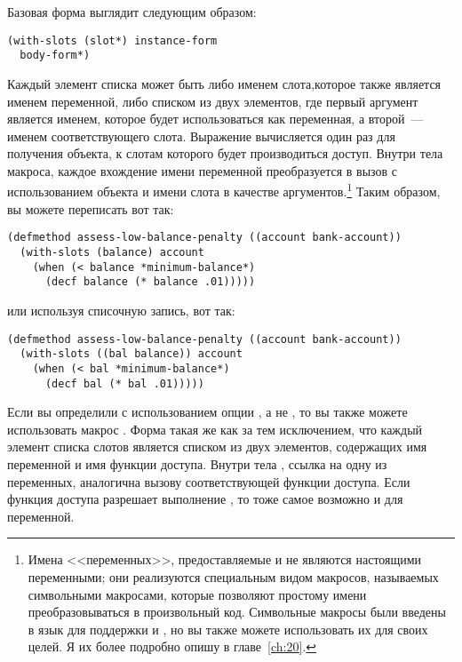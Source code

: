 Базовая форма   выглядит следующим образом:

\begin{lstlisting}
(with-slots (slot*) instance-form
  body-form*)
\end{lstlisting}

Каждый элемент списка  может быть либо именем слота,которое также является
именем переменной, либо списком из двух элементов, где первый аргумент является именем,
которое будет использоваться как переменная, а второй~--- именем соответствующего слота.
Выражение  вычисляется один раз для получения объекта, к слотам
которого будет производиться доступ.  Внутри тела макроса, каждое вхождение имени
переменной преобразуется в вызов  с использованием объекта и имени слота
в качестве аргументов.\footnote{Имена <<переменных>>, предоставляемые  и
   не являются настоящими переменными; они реализуются специальным
  видом макросов, называемых символьными макросами, которые позволяют простому имени
  преобразовываться в произвольный код.  Символьные макросы были введены в язык для
  поддержки  и , но вы также можете использовать их
  для своих целей.  Я их более подробно опишу в главе~\ref{ch:20}.}  Таким образом, вы можете
  переписать  вот так:

\begin{lstlisting}
(defmethod assess-low-balance-penalty ((account bank-account))
  (with-slots (balance) account
    (when (< balance *minimum-balance*)
      (decf balance (* balance .01)))))
\end{lstlisting}

или используя списочную запись, вот так:

\begin{lstlisting}
(defmethod assess-low-balance-penalty ((account bank-account))
  (with-slots ((bal balance)) account
    (when (< bal *minimum-balance*)
      (decf bal (* bal .01)))))
\end{lstlisting}

Если вы определили  с использованием опции , а не
, то вы также можете использовать макрос .  Форма
 такая же как  за тем исключением, что каждый
элемент списка слотов является списком из двух элементов, содержащих имя переменной и имя
функции доступа.  Внутри тела , ссылка на одну из переменных,
аналогична вызову соответствующей функции доступа.  Если функция доступа разрешает
выполнение , то тоже самое возможно и для переменной.

